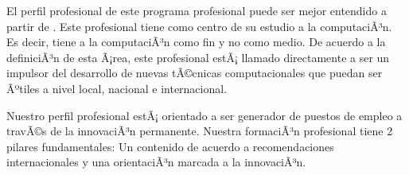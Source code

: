 \newcommand{\DocumentVersion}{V2.0}
\newcommand{\fecha}{\today}
\newcommand{\YYYY}{2012\xspace}
\newcommand{\Semester}{2012-1\xspace}
\newcommand{\city}{Lima\xspace}
\newcommand{\country}{PerÃº\xspace}
\newcommand{\dictionary}{EspaÃ±ol\xspace}
\newcommand{\GraphVersion}{2\xspace}
\newcommand{\CurriculaVersion}{2\xspace}
\newcommand{\OutcomesList}{a,b,c,d,e,f,g,h,i,j,k,l,m,HU}
\newcommand{\logowidth}{7cm}

\newcommand{\University}{Universidad Nacional de EducaciÃ³n Enrique GuzmÃ¡n y Valle -- La Cantuta \xspace}
\newcommand{\InstitutionURL}{http://www.une.edu.pe\xspace}
\newcommand{\underlogotext}{}

\newcommand{\FacultadName}{Ciencias\xspace}
\newcommand{\DepartmentName}{Ciencia de la ComputaciÃ³n\xspace}
\newcommand{\SchoolFullName}{Escuela Profesional de Ciencia de la ComputaciÃ³n (\DocumentVersion)}
\newcommand{\SchoolFullNameBreak}{Facultad de ComputaciÃ³n\\ Escuela Profesional de\\ ({\bf Ciencia de la ComputaciÃ³n}) (\DocumentVersion)\xspace}
\newcommand{\SchoolShortName}{({\bf Ciencia de la ComputaciÃ³n})\xspace}
\newcommand{\SchoolAcro}{EPCC\xspace}
\newcommand{\SchoolURL}{http://www.une.edu.pe/EPCC/}

\newcommand{\GradoAcademico}{Bachiller en Ciencia de la ComputaciÃ³n\xspace}
\newcommand{\TituloProfesional}{Licenciado en Ciencia de la ComputaciÃ³n\xspace}
\newcommand{\GradosyTitulos}%
{\begin{description}%
\item [Grado AcadÃ©mico: ] \GradoAcademico y%
\item [TÃ­tulo Profesional: ] \TituloProfesional%
\end{description}%
}

\newcommand{\doctitle}{Plan Curricular \YYYY\xspace del \SchoolFullName\\ \SchoolURL}

\newcommand{\AbstractIntro}{Este documento representa el informe final de la nueva malla curricular \YYYY del 
\SchoolFullName de la \University (\textit{\InstitutionURL}) en la ciudad de \city-\country.}

\newcommand{\OtherKeyStones}%

\newcommand{\profile}{%
El perfil profesional de este programa profesional puede ser mejor entendido a partir de
. 
Este profesional tiene como centro de su estudio a la computaciÃ³n. Es decir, tiene a la computaciÃ³n 
como fin y no como medio. De acuerdo a la definiciÃ³n de esta Ã¡rea, este profesional estÃ¡ llamado 
directamente a ser un impulsor del desarrollo de nuevas tÃ©cnicas computacionales que 
puedan ser Ãºtiles a nivel local, nacional e internacional.

Nuestro perfil profesional estÃ¡ orientado a ser generador de puestos de empleo a travÃ©s de la innovaciÃ³n permanente. 
Nuestra formaciÃ³n profesional tiene 2 pilares fundamentales: 
Un contenido de acuerdo a recomendaciones internacionales y una orientaciÃ³n marcada a la innovaciÃ³n.
}

